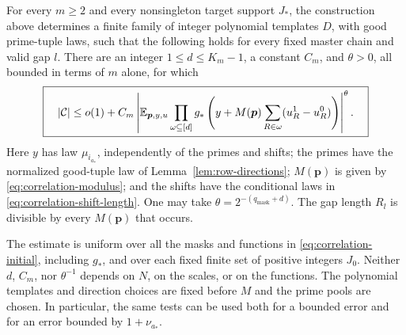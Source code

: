 \begin{proposition}\label{prop:correlation-test}
For every $m\ge2$ and every nonsingleton target support $J_*$, the
construction above determines a finite family of integer polynomial
templates $D$, with good prime-tuple laws, such that the following holds
for every fixed master chain and valid gap $l$.
There are an integer $1\le d\le K_m-1$, a constant $C_m$, and
$\theta>0$, all bounded in terms of $m$ alone, for which
\begin{equation}
 \boxed{\quad
 |\mathcal C|
 \le o(1)+C_m\left|
  \mathbb E_{\boldsymbol p,y,u}
  \prod_{\omega\subseteq[d]}
  g_*\left(y+M(\boldsymbol p)
                  \sum_{R\in\omega}(u_R^1-u_R^0)\right)
                       \right|^{\theta}.
 \quad}
 \label{eq:correlation-test}
\end{equation}
Here $y$ has law $\mu_{i_{a_*}}$, independently of the primes and
shifts; the primes have the normalized good-tuple law of
Lemma~\ref{lem:row-directions}; $M(\boldsymbol p)$ is given by
\eqref{eq:correlation-modulus}; and the shifts have the conditional laws
in \eqref{eq:correlation-shift-length}.  One may take
$\theta=2^{-(q_{\mathrm{mask}}+d)}$.  The gap length $R_l$ is divisible by every
$M(\boldsymbol p)$ that occurs.

The estimate is uniform over all the masks and functions in
\eqref{eq:correlation-initial}, including $g_*$, and over each fixed
finite set of positive integers $J_0$.  Neither $d$, $C_m$, nor
$\theta^{-1}$ depends on $N$, on the scales, or on the functions.
The polynomial templates and direction choices are fixed before $M$
and the prime pools are chosen.  In particular, the same tests can be
used both for a bounded error and for an error bounded by
$1+\nu_{a_*}$.
\end{proposition}


